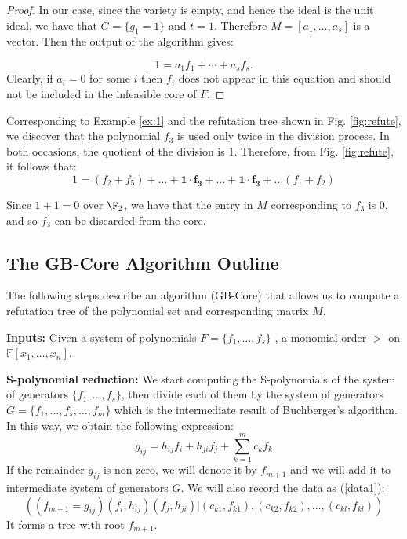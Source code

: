 \begin{proof}
In our case, since the variety is empty, and hence the ideal is the
unit ideal, we have that $G = \{g_1=1\}$ and $t=1$. Therefore $M=
[a_1, \ldots, a_s]$ is a vector. Then the output of the algorithm
gives:

$$1 = a_1f_1+\cdots + a_s f_s.$$ Clearly, if $a_i=0$ for some $i$ then
$f_i$ does not appear in this equation and should not be included in
the infeasible core of $F$. 

\end{proof}


\begin{example}

Corresponding to Example \ref{ex:1} and the refutation tree shown in
Fig. \ref{fig:refute}, we discover that the polynomial $f_3$ is used
only twice in the division process. In both occasions, the quotient of
the division is 1. Therefore, from Fig. \ref{fig:refute}, it follows that:
\begin{equation}
1 = (f_2 + f_5) + \dots + \mathbf{1\cdot f_3} + \dots + \mathbf{1\cdot f_3}+ \dots (f_1
+ f_2)
\end{equation}

Since $1 + 1 = 0$ over $\F_2$, we have that the entry in $M$
corresponding to $f_3$ is 0, and so $f_3$ can be discarded from the
core. 
\end{example}

\subsection{The GB-Core Algorithm Outline}

The following steps describe an algorithm (GB-Core) that allows us to compute a
refutation tree of the polynomial set and corresponding matrix $M$. 

{\bf Inputs:} Given a system of polynomials $F=\{f_1,\ldots,f_s\}$
, a monomial order $>$ on $\mathbb{F}[x_1,\ldots,x_n]$. 

{\bf S-polynomial reduction:} We start computing the S-polynomials of the system of
generators $\{f_1,\ldots,f_s\}$, then divide each of them by the system of
generators $G=\{f_1,\dots,f_s,\dots,f_m\}$ which is the intermediate result of Buchberger's algorithm. 
In this way, we obtain the following expression:
\begin{equation}
\label{eqn:red}
g_{ij}= h_{ij}f_{i}+h_{ji}f_{j}+\displaystyle\sum_{k=1}^m c_kf_k
\end{equation}
If the remainder $g_{ij}$ is non-zero, we will denote it by
$f_{m+1}$ and we will add it to intermediate system of generators $G$. We
will also record the data as (\ref{data1}): 
\begin{displaymath}
((f_{m+1}=g_{ij})(f_{i},h_{ij})(f_{j},h_{ji})| (c_{k1},f_{k1}),(c_{k2},f_{k2}),\dots,(c_{kl},f_{kl}))
\end{displaymath}
It forms a tree with root $f_{m+1}$.

